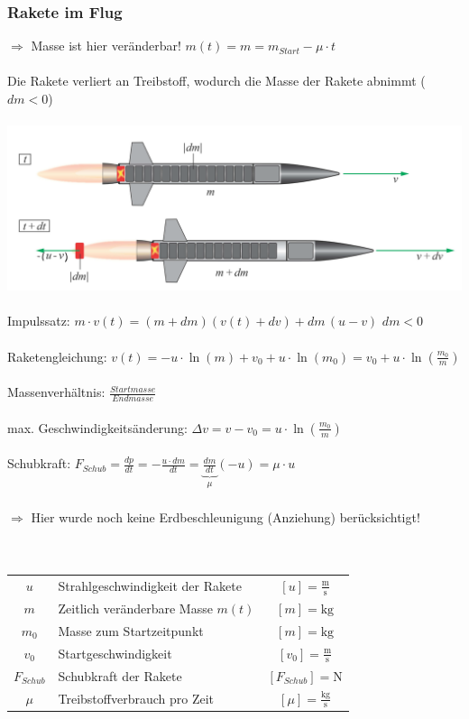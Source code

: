 		\subsubsection{Rakete im Flug}
			$\Rightarrow$ Masse ist hier veränderbar! \qquad $m(t) = m = m_{Start} - \mu \cdot t$ \\
			\\
			Die Rakete verliert an Treibstoff, wodurch die Masse der Rakete abnimmt ($dm < 0$)\\
			\\	
			\includegraphics[width=0.73\linewidth]{Bilder/rakete} \\
			\\
			Impulssatz: \quad $ m \cdot v(t) = (m + dm)(v(t) + dv) + dm \,(u-v) $ \qquad $dm < 0$ \\
			\\
			Raketengleichung: $v(t) = - u \cdot \ln(m) + v_0 + u \cdot \ln(m_0) = v_0 + u \cdot \ln(\frac{m_0}{m})$ \\
			\\
			Massenverhältnis: $\frac{Startmasse}{Endmasse}$ \\
			\\
			max. Geschwindigkeitsänderung: $\Delta v = v - v_0 = u \cdot \ln(\frac{m_0}{m})$ \\
			\\
			Schubkraft: $F_{Schub} = \frac{dp}{dt} = - \frac{u \cdot dm}{dt} =  \underbrace{ \frac{dm}{dt} }_{\substack{\mu}} (-u) = \mu \cdot u$ \\ 
			\\
			$\Rightarrow$ Hier wurde noch keine Erdbeschleunigung (Anziehung) berücksichtigt! \\
			\\
			\\
			\begin{tabular}{c l c}
				$u$ &  Strahlgeschwindigkeit der Rakete & $[u] =  \mathrm{\frac{m}{s}}$ \\	
				$m$ & Zeitlich veränderbare Masse $m(t)$ & $[m] = \mathrm{kg}$ \\
				$m_0$ & Masse zum Startzeitpunkt & $[m] = \mathrm{kg}$ \\
				$v_0$ & Startgeschwindigkeit & $[v_0] = \mathrm{\frac{m}{s}}$ \\
				$F_{Schub}$ & Schubkraft der Rakete & $[F_{Schub}] = \mathrm{N}$ \\
				$\mu$ & Treibstoffverbrauch pro Zeit & $[\mu] = \mathrm{\frac{kg}{s}}$
			\end{tabular}

